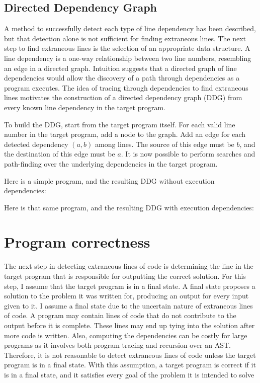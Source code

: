 \subsection{Directed Dependency Graph}
A method to successfully detect each type of line dependency has been described, but that detection alone is not sufficient for finding extraneous lines. The next step to find extraneous lines is the selection of an appropriate data structure. A line dependency is a one-way relationship between two line numbers, resembling an edge in a directed graph. Intuition suggests that a directed graph of line dependencies would allow the discovery of a path through dependencies as a program executes. The idea of tracing through dependencies to find extraneous lines motivates the construction of a directed dependency graph (DDG) from every known line dependency in the target program.

To build the DDG, start from the target program itself. For each valid line number in the target program, add a node to the graph. Add an edge for each detected dependency $(a,b)$ among lines. The source of this edge must be $b$, and the destination of this edge must be $a$. It is now possible to perform searches and path-finding over the underlying dependencies in the target program.

Here is a simple program, and the resulting DDG without execution dependencies:


Here is that same program, and the resulting DDG with execution dependencies:


\section{Program correctness}
The next step in detecting extraneous lines of code is determining the line in the target program that is responsible for outputting the correct solution. For this step, I assume that the target program is in a final state. A final state proposes a solution to the problem it was written for, producing an output for every input given to it. I assume a final state due to the uncertain nature of extraneous lines of code. A program may contain lines of code that do not contribute to the output before it is complete. These lines may end up tying into the solution after more code is written. Also, computing the dependencies can be costly for large programs as it involves both program tracing and recursion over an AST. Therefore, it is not reasonable to detect extraneous lines of code unless the target program is in a final state. With this assumption, a target program is correct if it is in a final state, and it satisfies every goal of the problem it is intended to solve

